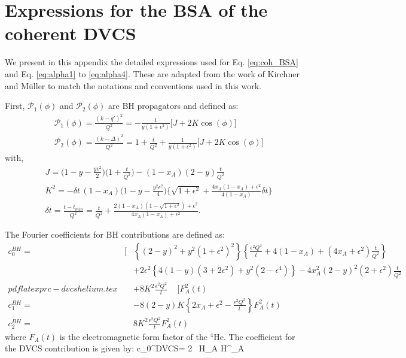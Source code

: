 \documentclass{article}
\let\oldequation\equation
\let\oldendequation\endequation
\renewenvironment{equation}
  {\linenomathNonumbers\oldequation}
  {\oldendequation\endlinenomath}
\begin{document}



\appendix
\section{Expressions for the BSA of the coherent DVCS}
\label{sec:eq}

We present in this appendix the detailed expressions used for Eq. \ref{eq:coh_BSA} 
and Eq. \ref{eq:alpha1} to \ref{eq:alpha4}. These are adapted from the work of 
Kirchner and Müller \cite{Kirchner:2003wt} to match the notations and conventions used
in this work.
	
First, $\mathcal{P}_{1}(\phi)$ and $\mathcal{P}_{2}(\phi)$ are BH propagators and defined as:
\begin{align}
&\mathcal{P}_{1}(\phi) = \frac{(k - q')^{2}}{Q^{2}} = - \frac{1}{y (1 + \epsilon^{2})} 
\big[ J + 2 K \cos(\phi) \big] \\
&\mathcal{P}_{2}(\phi) = \frac{(k - \Delta)^{2}}{Q^{2}} = 1 + \frac{t}{Q^{2}} + 
\frac{1}{y (1 + \epsilon^{2})} \big[ J + 2 K \cos(\phi) \big]
\end{align}
with,
\begin{align}
& J = \bigg( 1 - y - \frac{y \epsilon^{2}}{2} \bigg) \bigg(1 + \frac{t}{Q^{2}} \bigg) - 
(1 - x_{A})(2 - y) \frac{t}{Q^{2}} \\
& K^{2} = - \delta t \, (1 - x_{A}) \bigg( 1 - y - \frac{y^{2} \epsilon^{2}}{4} \bigg) 
\bigg\{ \sqrt{1 + \epsilon^{2}} + \frac{4 x_{A} (1-x_{A}) + \epsilon^{2}}{4 (1 - x_{A})}
\delta t \bigg\} \\
& \delta t = \frac{t - t_{min}}{Q^{2}} = \frac{t}{Q^{2}} + \frac{2(1-x_{A}) \left(1- \sqrt{1 + 
\epsilon^{2}} \right) + \epsilon^{2}}{4 x_{A} (1- x_{A}) + \epsilon^{2}}.
\end{align}

The Fourier coefficients for BH contributions are defined as:
\begin{eqnarray}
c_0^{BH} = & \bigg[ & \left\{ {(2-y)}^2 + y^2{(1+\epsilon^2)}^2 \right\} 
\left\{ \frac{\epsilon^2 Q^2}{t} + 4 (1-x_A) + (4x_A+\epsilon^2) \frac{t}{Q^2} 
\right\} \nonumber \\
& \phantom{\bigg[} & + 2 \epsilon^2 \left\{ 4(1-y)(3+2\epsilon^2) + y^2(2-\epsilon^4) 
\right\} - 4 x_A^2{(2-y)}^2 (2+\epsilon^2) \frac{t}{Q^2} \nonumber \\
pdflatex prc-dvcshelium.tex
& \phantom{\bigg[} & + 8 K^2 \frac{\epsilon^2 Q^2}{t} \,\,\,\,\,\,\, \bigg] F_A^2(t)  \\
c_1^{BH} = & \phantom{\bigg[} & -8 (2-y) K \left\{ 2 x_A + \epsilon^2 - 
\frac{\epsilon^2 Q^2}{t} \right\} F_A^2(t)  \\
c_2^{BH} = & \phantom{\bigg[} & 8 K^2 \frac{\epsilon^2 Q^2}{t} F_A^2(t) 
\end{eqnarray} 
where $F_A(t)$ is the electromagnetic form factor of the $^4$He. 
The coefficient for the DVCS contribution is given by: 
\begin{equation}
   c_0^{DVCS}= 2  \, 
   {\mathcal H}_A {\mathcal H}^{\star}_A 
   \label{eq:c0DVCS}
\end{equation}
\end{document}
